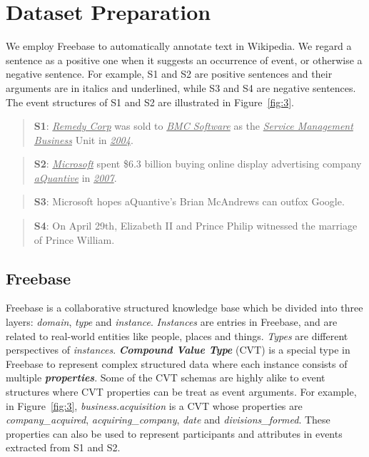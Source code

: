 \section{Dataset Preparation}
We employ Freebase to automatically annotate text in Wikipedia. We regard a sentence as a positive one when it suggests an occurrence of event, or otherwise a negative sentence. For example, S1 and S2 are positive sentences and their arguments are in italics and underlined, while S3 and S4 are negative sentences. The event structures of S1 and S2 are illustrated in Figure~\ref{fig:3}.

\begin{quote}
	\textbf{S1}: \underline{\emph{Remedy Corp}} was sold to \underline{\emph{BMC Software}} as the \underline{\emph{Service Management Business}} Unit in \underline{\emph{2004}}.
\end{quote}
\begin{quote}
	\textbf{S2}: \underline{\emph{Microsoft}} spent \$6.3 billion buying online display advertising company \underline{\emph{aQuantive}} in \underline{\emph{2007}}.
\end{quote}
\begin{quote}
	\textbf{S3}: Microsoft hopes aQuantive's Brian McAndrews can outfox Google.
\end{quote}
\begin{quote}
	\textbf{S4}: On April 29th, Elizabeth II and Prince Philip witnessed the marriage of Prince William.
\end{quote}

\subsection{Freebase}
Freebase\cite{bollacker2008freebase} is a collaborative structured knowledge base which be divided into three layers: \emph{domain}, \emph{type} and \emph{instance}. \emph{Instances} are entries in Freebase, and are related to real-world entities like people, places and things. \emph{Types} are different perspectives of \emph{instances}. 
\textbf{\emph{Compound Value Type}} (CVT) is a special type in Freebase to represent complex structured data where each instance consists of multiple \textbf{\emph{properties}}. Some of the CVT schemas are highly alike to event structures where CVT properties can be treat as event arguments. For example, in Figure~\ref{fig:3}, \emph{business.acquisition} is a CVT whose properties are \emph{company\_acquired}, \emph{acquiring\_company}, \emph{date} and \emph{divisions\_formed}. These properties can also be used to represent participants and attributes in events extracted from S1 and S2.

